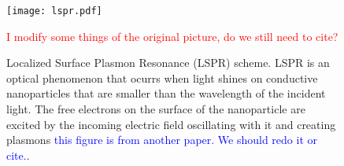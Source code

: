 
\begin{figure}[h] %
   \centering
   \texttt{[image: lspr.pdf]} 
   \caption{Localized Surface Plasmon Resonance (LSPR) scheme. LSPR is an 
            optical phenomenon that ocurrs when light shines on conductive 
            nanoparticles that are smaller than the wavelength of the incident 
            light. The free electrons on the surface of the nanoparticle are 
            excited by the incoming electric field oscillating with it and 
            creating plasmons \textcolor{blue}{this figure is from another paper. We should redo it or cite.}.}\textcolor{red}{I modify some things of the original picture, do we still need to cite?}
   \label{fig:lspr}
\end{figure}




